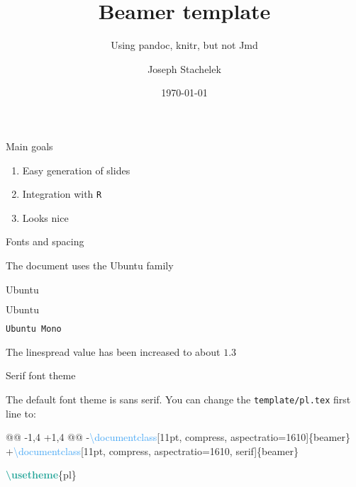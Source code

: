 \documentclass[11pt, compress, aspectratio=1610]{beamer}
\title{Beamer template}
\subtitle{Using pandoc, knitr, but not Jmd}
\date{\today}
\author{Joseph Stachelek}
\institute{Michigan State University}
\newenvironment{Shaded}{\begin{mdframed}}{\end{mdframed}}
\newcommand{\FunctionTok}[1]{\textcolor[HTML]{26A69A}{\textbf{{#1}}}}
\newcommand{\BuiltInTok}[1]{\textcolor[HTML]{42A5F5}{{#1}}}
\newcommand{\ExtensionTok}[1]{\textcolor[rgb]{0.74,0.68,0.62}{{#1}}}
\newcommand{\NormalTok}[1]{\textcolor[HTML]{212121}{{#1}}}
\providecommand{\tightlist}{%
  \setlength{\itemsep}{0pt}\setlength{\parskip}{0pt}}
\let\OldTexttt\texttt
\renewcommand{\texttt}[1]{\OldTexttt{\color{plTT}#1}}
\begin{document}
\maketitle

\begin{frame}[fragile]{Main goals}

\begin{enumerate}
\def\labelenumi{\arabic{enumi}.}
\tightlist
\item
  Easy generation of slides
\item
  Integration with \texttt{R}
\item
  Looks nice
\end{enumerate}

\end{frame}

\begin{frame}[fragile]{Fonts and spacing}

The document uses the \alert{Ubuntu} family

\begin{description}
\tightlist
\item[Main body]
Ubuntu
\item[Maths]
\(\text{Ubuntu}\)
\item[Code]
\texttt{Ubuntu\ Mono}
\end{description}

The linespread value has been increased to about \(1.3\)

\end{frame}

\begin{frame}[fragile]{Serif font theme}

The default font theme is sans serif. You can change the
\texttt{template/pl.tex} first line to:

\begin{Shaded}
\begin{Highlighting}[]
\NormalTok{@@ -1,4 +1,4 @@}
\NormalTok{-}\BuiltInTok{\textbackslash{}documentclass}\NormalTok{[11pt, compress, aspectratio=1610]\{}\ExtensionTok{beamer}\NormalTok{\}}
\NormalTok{+}\BuiltInTok{\textbackslash{}documentclass}\NormalTok{[11pt, compress, aspectratio=1610, serif]\{}\ExtensionTok{beamer}\NormalTok{\}}

\FunctionTok{\textbackslash{}usetheme}\NormalTok{\{pl\}}
\end{Highlighting}
\end{Shaded}

\end{frame}
\end{document}
